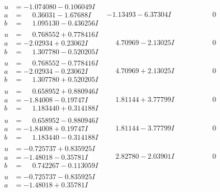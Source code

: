\documentclass[1p]{elsarticle_modified}
\theoremstyle{definition}
\begin{document}
$$\begin{array}{c|c|c}
 \hline 
\begin{aligned}
u &= -1.074080 - 0.106049 I \\
a &= \phantom{-}0.36031 - 1.67688 I \\
b &= \phantom{-}1.095130 - 0.436256 I\end{aligned}
 & -1.13493 - 6.37304 I & \phantom{-0.000000 } 0 \\ \hline\begin{aligned}
u &= \phantom{-}0.768552 + 0.778416 I \\
a &= -2.02934 + 0.23062 I \\
b &= \phantom{-}1.307780 - 0.520205 I\end{aligned}
 & \phantom{-}4.70969 - 2.13025 I & \phantom{-0.000000 } 0 \\ \hline\begin{aligned}
u &= \phantom{-}0.768552 - 0.778416 I \\
a &= -2.02934 - 0.23062 I \\
b &= \phantom{-}1.307780 + 0.520205 I\end{aligned}
 & \phantom{-}4.70969 + 2.13025 I & \phantom{-0.000000 } 0 \\ \hline\begin{aligned}
u &= \phantom{-}0.658952 + 0.880946 I \\
a &= -1.84008 - 0.19747 I \\
b &= \phantom{-}1.183440 + 0.314188 I\end{aligned}
 & \phantom{-}1.81144 + 3.77799 I & \phantom{-0.000000 } 0 \\ \hline\begin{aligned}
u &= \phantom{-}0.658952 - 0.880946 I \\
a &= -1.84008 + 0.19747 I \\
b &= \phantom{-}1.183440 - 0.314188 I\end{aligned}
 & \phantom{-}1.81144 - 3.77799 I & \phantom{-0.000000 } 0 \\ \hline\begin{aligned}
u &= -0.725737 + 0.835925 I \\
a &= -1.48018 - 0.35781 I \\
b &= \phantom{-}0.742267 - 0.113059 I\end{aligned}
 & \phantom{-}2.82780 - 2.03901 I & \phantom{-0.000000 } 0 \\ \hline\begin{aligned}
u &= -0.725737 - 0.835925 I \\
a &= -1.48018 + 0.35781 I \\

\end{aligned}
\end{array}$$
\end{document}
